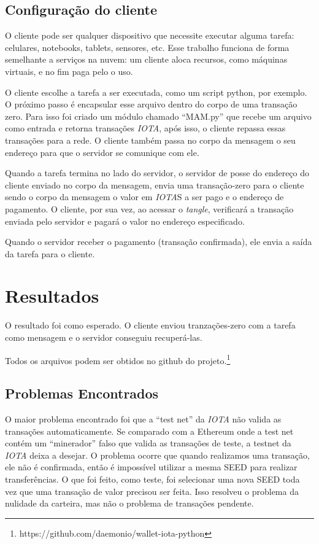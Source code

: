 \documentclass[a4paper]{article}
\begin{document}
\subsection{Configuração do cliente}

O cliente pode ser qualquer dispositivo que necessite executar alguma tarefa: celulares, notebooks, tablets, sensores, etc.
Esse trabalho funciona de forma semelhante a serviços na nuvem: um cliente aloca recursos, como máquinas virtuais, e no fim
paga pelo o uso.

O cliente escolhe a tarefa a ser executada, como um script python, por exemplo. O próximo passo é encapsular esse arquivo dentro
do corpo de uma transação zero. Para isso foi criado um módulo chamado ``MAM.py'' que recebe um arquivo como entrada e retorna
transações \textit{IOTA}, após isso, o cliente repassa essas transações para a rede. O cliente também passa no corpo da mensagem o
seu endereço para que o servidor se comunique com ele.

Quando a tarefa termina no lado do servidor, o servidor de posse do endereço do cliente enviado no corpo da mensagem, envia uma
transação-zero para o cliente sendo o corpo da mensagem o valor em \textit{IOTA}S a ser pago e o endereço de pagamento. O cliente, por sua vez,
ao acessar o \textit{tangle}, verificará a transação enviada pelo servidor e pagará o valor no endereço especificado.

Quando o servidor receber o pagamento (transação confirmada), ele envia a saída da tarefa para o cliente.

\section{Resultados}\label{sec:Output}

O resultado foi como esperado. O cliente enviou tranzações-zero com a tarefa como mensagem e o servidor conseguiu recuperá-las.

Todos os arquivos podem ser obtidos no github do projeto.\footnote{https://github.com/daemonio/wallet-iota-python}

\subsection{Problemas Encontrados}

O maior problema encontrado foi que a ``test net'' da \textit{IOTA} não valida as transações automaticamente. Se comparado com a Ethereum onde a test net
contém um ``minerador'' falso que valida as transações de teste, a testnet da \textit{IOTA} deixa a desejar. O problema ocorre que quando
realizamos uma transação, ele não é confirmada, então é impossível utilizar a mesma SEED para realizar transferências. O que foi feito,
como teste, foi selecionar uma nova SEED toda vez que uma transação de valor precisou ser feita. Isso resolveu o problema da nulidade
da carteira, mas não o problema de transações pendente.
\end{document}
